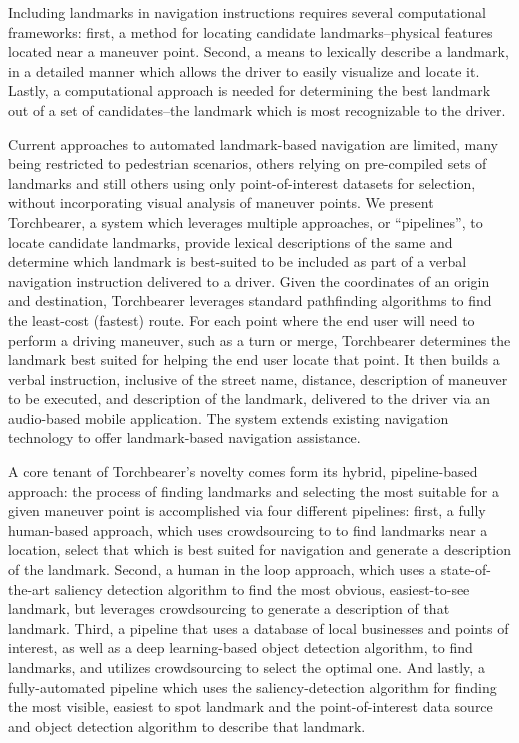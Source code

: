 Including landmarks in navigation instructions requires several computational frameworks: first, a method for locating candidate landmarks--physical features located near a maneuver point. Second, a means to lexically describe a landmark, in a detailed manner which allows the driver to easily visualize and locate it. Lastly, a computational approach is needed for determining the best landmark out of a set of candidates--the landmark which is most recognizable to the driver. 

Current approaches to automated landmark-based navigation are limited, many being restricted to pedestrian scenarios, others relying on pre-compiled sets of landmarks and still others using only point-of-interest datasets for selection, without incorporating visual analysis of maneuver points. We present Torchbearer, a system which leverages multiple approaches, or “pipelines”, to locate candidate landmarks, provide lexical descriptions of the same and determine which landmark is best-suited to be included as part of a verbal navigation instruction delivered to a driver. Given the coordinates of an origin and destination, Torchbearer leverages standard pathfinding algorithms to find the least-cost (fastest) route. For each point where the end user will need to perform a driving maneuver, such as a turn or merge, Torchbearer determines the landmark best suited for helping the end user locate that point. It then builds a verbal instruction, inclusive of the street name, distance, description of maneuver to be executed, and description of the landmark, delivered to the driver via an audio-based mobile application. The system extends existing navigation technology to offer landmark-based navigation assistance.
 
A core tenant of Torchbearer's novelty comes form its hybrid, pipeline-based approach: the process of finding landmarks and selecting the most suitable for a given maneuver point is accomplished via four different pipelines: first, a fully human-based approach, which uses crowdsourcing to to find landmarks near a location, select that which is best suited for navigation and generate a description of the landmark. Second, a human in the loop approach, which uses a state-of-the-art saliency detection algorithm to find the most obvious, easiest-to-see landmark, but leverages crowdsourcing to generate a description of that landmark. Third, a pipeline that uses a database of local businesses and points of interest, as well as a deep learning-based object detection algorithm, to find landmarks, and utilizes crowdsourcing to select the optimal one. And lastly, a fully-automated pipeline which uses the saliency-detection algorithm for finding the most visible, easiest to spot landmark and the point-of-interest data source and object detection algorithm to describe that landmark.

